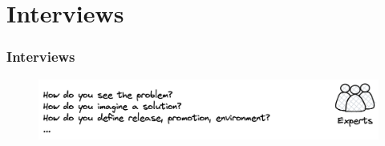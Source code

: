 \documentclass{beamer}
\begin{document}
\section{Interviews}

\begin{frame}
	\frametitle{Interviews}
\begin{figure}[h]
	\centering
	\includegraphics[width=1.0\linewidth]{assets/interviews-methodology-slide.png}
	\label{fig:interviews-methodology-slide}	
\end{figure}

\end{frame}
\end{document}
